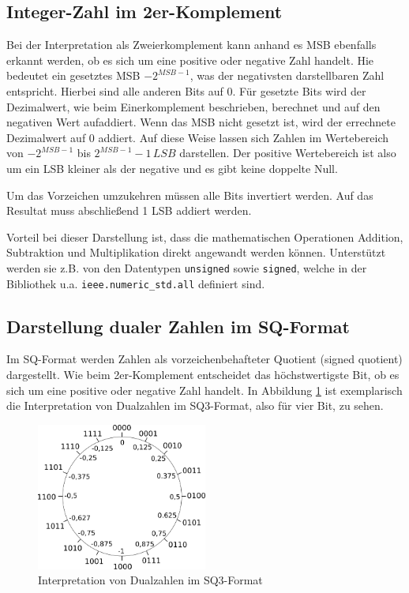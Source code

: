 \subsection{Integer-Zahl im 2er-Komplement}\label{sec:Integer2erKomplement}

Bei der Interpretation als Zweierkomplement kann anhand es MSB ebenfalls erkannt werden, ob es sich um eine positive oder negative Zahl handelt. 
Hie bedeutet ein gesetztes MSB $-2^{MSB-1}$, was der negativsten darstellbaren Zahl entspricht. Hierbei sind alle anderen 
Bits auf 0. Für gesetzte Bits wird der Dezimalwert, wie beim Einerkomplement beschrieben, berechnet und auf den negativen Wert aufaddiert. Wenn das MSB nicht gesetzt
ist, wird der errechnete Dezimalwert auf 0 addiert. Auf diese Weise lassen sich Zahlen im Wertebereich von $-2^{MSB-1}$ bis $2^{MSB-1}-1 \,LSB$ darstellen. Der positive
Wertebereich ist also um ein LSB kleiner als der negative und es gibt keine doppelte Null.

Um das Vorzeichen umzukehren müssen alle Bits invertiert werden. Auf das Resultat muss abschließend 1 LSB addiert werden.

Vorteil bei dieser Darstellung ist, dass die mathematischen Operationen Addition, Subtraktion und Multiplikation direkt angewandt werden können. Unterstützt werden sie z.B. 
von den Datentypen \texttt{unsigned} sowie \texttt{signed}, welche in der Bibliothek u.a. \texttt{ieee.numeric\_std.all} definiert sind.


\subsection{Darstellung dualer Zahlen im SQ-Format}
Im SQ-Format werden Zahlen als vorzeichenbehafteter Quotient (signed quotient) dargestellt. Wie beim 2er-Komplement entscheidet das höchstwertigste Bit, ob es sich um eine
positive oder negative Zahl handelt. In Abbildung \ref{pic:SQKreis} ist exemplarisch die Interpretation von Dualzahlen im SQ3-Format, also für vier Bit, zu sehen.

\begin{figure}[ht!]
 \centering
 \includegraphics[width=0.5\textwidth]{img/SQ-Kreis.png}
 \caption{Interpretation von Dualzahlen im SQ3-Format}
 \label{pic:SQKreis}
\end{figure}


